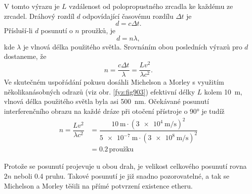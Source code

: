 \begin{mdframed}[style=mdexam]
\begin{example}
    V tomto výrazu je \(L\) vzdálenost od polopropustného zrcadla ke každému ze zrcadel. Dráhový
    rozdíl \(d\) odpovídající časovému rozdílu \(\Delta t\) je
    \begin{equation*}
      d = c \Delta t.
    \end{equation*}
    Přísluší-li \(d\) posunutí o \(n\) proužků, je
    \begin{equation*}
      d = n\lambda,
    \end{equation*}
    kde \(\lambda\) je vlnová délka použitého světla. Srovnáním obou posledních výrazů pro \(d\)
    dostaneme, že
    \begin{equation*}
      n = \dfrac{c\Delta t}{\lambda} = \dfrac{Lv^2}{\lambda c^2}.
    \end{equation*}    
    Ve skutečném uspořádání pokusu dosáhli Michelson a Morley s využitím několika­násobných odrazů
    (viz obr. \ref{fyz:fig903}) efektivní délky \(L\) kolem \SI{10}{\meter}, vlnová délka použitého
    světla byla asi \SI{500}{\nano\meter}. Očekávané posunutí interferenčního obrazu na každé dráze
    při otočení přístroje o \ang{90} je tudíž 
    \begin{align*}
      n  = \dfrac{Lv^2}{\lambda c^2} 
        &= \dfrac{\SI{10}{\meter}\cdot(\SI{3e4}{\meter\per\second})^2}
                {\SI{5e-7}{\meter}\cdot(\SI{3e8}{\meter\per\second})^2}     \\
        &= 0.2\,\text{proužku}
    \end{align*}
    {\centering
    \captionsetup{type=figure}
    \par}
    \vspace{1em}
    Protože se posunutí projevuje u obou drah, je velikost celkového posunutí rovna \(2n\) neboli
    \num{0.4} pruhu. Takové posunutí je již snadno pozorovatelné, a tak se Michelson a Morley těšili
    na přímé potvrzení existence etheru.
  \end{example}
\end{mdframed}